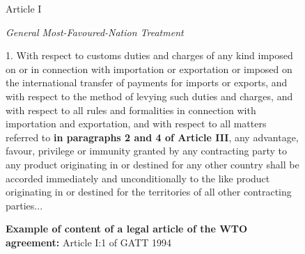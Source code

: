\begin{figure}[ht]
    \begin{tightcenter}
        Article I
    \end{tightcenter}
    \begin{tightcenter}
        \textit{General Most-Favoured-Nation Treatment}
    \end{tightcenter}
    1. With respect to customs duties and charges of any kind imposed on or in connection
    with importation or exportation or imposed on the international transfer of payments for
    imports or exports, and with respect to the method of levying such duties and charges, and
    with respect to all rules and formalities in connection with importation and exportation, and
    with respect to all matters referred to \textbf{in paragraphs 2 and 4 of Article III}, any advantage,
    favour, privilege or immunity granted by any contracting party to any product originating in
    or destined for any other country shall be accorded immediately and unconditionally to the
    like product originating in or destined for the territories of all other contracting parties...
    \caption{\textbf{Example of content of a legal article of the WTO agreement:} Article I:1 of GATT 1994}
    \label{fig:gatt_art1}
\end{figure}






